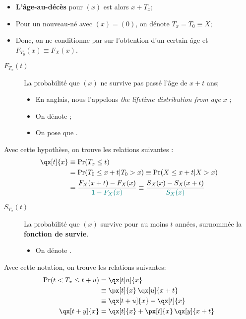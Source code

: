 \documentclass[10pt, french]{article}
\begin{document}
\begin{multicols*}{3}
\begin{definitionNOHFILLsub}
\begin{itemize}[leftmargin = *]
	\item	\textbf{L'âge-au-décès} pour $(x)$ est alors $x + T_{x}$;
	\item	Pour un nouveau-né avec $(x) = (0)$, on dénote $T_{x} = T_{0} \equiv X$;
	\item	Donc, on ne conditionne par sur l'obtention d'un certain âge et $F_{T_{0}}(x) \equiv F_{X}(x)$.
\end{itemize}
\tcbline
\begin{description}
	\item[$F_{T_{x}}(t)$]	La probabilité que $(x)$ ne survive pas passé l'âge de $x + t$ ans;
		\begin{itemize}[leftmargin = *]
		\item	En anglais, nous l'appelons \og \textit{the lifetime distribution from age $x$} \fg{};	
		\item	On dénote ;
		\item	On pose que .
		\end{itemize}
\end{description}

Avec cette hypothèse, on trouve les relations suivantes :
\begin{align*}
	\qx[t]{x}
	&\equiv	\Pr(T_{x} \leq t)  	\\
	&=	\Pr(T_{0} \leq x + t | T_{0} > x) 
	\equiv	\Pr(X \leq x + t | X > x) \\
	&=	\frac{F_{X}(x + t) - F_{X}(x)}{\textcolor{teal}{1 - F_{X}(x)}}
	\equiv	\frac{S_{X}(x) - S_{X}(x + t)}{\textcolor{teal}{S_{X}(x)}}
\end{align*}

\begin{description}
	\item[$S_{T_{x}}(t)$]	La probabilité que $(x)$ survive pour au moins $t$ années, surnommée la \textbf{fonction de survie}.
		\begin{itemize}[leftmargin = *]
		\item	On dénote .
		\end{itemize}
\end{description}

\tcbline

Avec cette notation, on trouve les relations suivantes:
\begin{align*}
	\Pr(t	<	T_{x}	\leq	t + u)
	&= \qx[t|u]{x}	\\
	&\equiv \px[t]{x} \, \qx[u]{x+t}	\\
	&\equiv \qx[t + u]{x} - \qx[t]{x}	\\
	\qx[t + y]{x} 
	&= \qx[t]{x} + \px[t]{x} \, \qx[y]{x + t}
\end{align*}
\end{definitionNOHFILLsub}


\end{multicols*}
\end{document}
